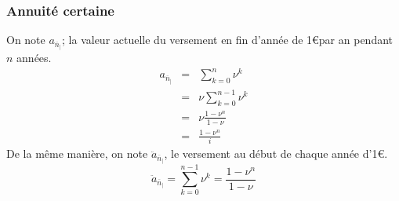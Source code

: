 \documentclass{report}
\begin{document}
\subsubsection{Annuité certaine}
On note $a_\overline{n}_|$; la valeur actuelle du versement en fin d'année de 1\euro par an pendant $n$ années.\begin{eqnarray}
a_\overline{n}_|&=&\displaystyle\sum^n_{k=0}\nu^k\nonumber\\
&=&\nu\displaystyle\sum^{n-1}_{k=0}\nu^k\nonumber\\
&=&\nu\displaystyle\frac{1-\nu^n}{1-\nu}\nonumber\\
&=&\displaystyle\frac{1-\nu^n}{i}\nonumber
\end{eqnarray}
De la même manière, on note $\ddot{a}_\overline{n}_|$, le versement au début de chaque année d'1\euro.\[\ddot{a}_\overline{n}_| = \displaystyle\sum_{k=0}^{n-1}\nu^k=\displaystyle\frac{1-\nu^n}{1-\nu}\]
\end{document}
